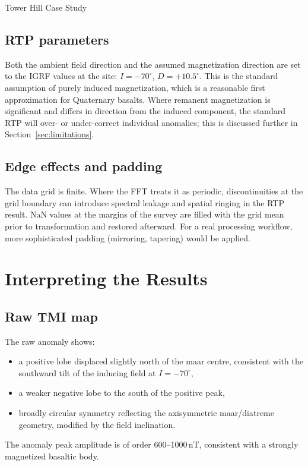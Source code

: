 \begin{activity}{Tower Hill Case Study}
\subsection{RTP parameters}

Both the ambient field direction and the assumed magnetization direction
are set to the IGRF values at the site:
$I = -70^\circ$, $D = +10.5^\circ$.
This is the standard assumption of purely induced magnetization, which is
a reasonable first approximation for Quaternary basalts.
Where remanent magnetization is significant and differs in direction
from the induced component, the standard RTP will over- or under-correct
individual anomalies; this is discussed further in Section~\ref{sec:limitations}.

\subsection{Edge effects and padding}

The data grid is finite.
Where the FFT treats it as periodic, discontinuities at the grid boundary
can introduce spectral leakage and spatial ringing in the RTP result.
NaN values at the margins of the survey are filled with the grid mean prior
to transformation and restored afterward.
For a real processing workflow, more sophisticated padding (mirroring,
tapering) would be applied.

\section{Interpreting the Results}

\subsection{Raw TMI map}

The raw anomaly shows:
\begin{itemize}
  \item a positive lobe displaced slightly north of the maar centre, consistent
        with the southward tilt of the inducing field at $I = -70^\circ$,
  \item a weaker negative lobe to the south of the positive peak,
  \item broadly circular symmetry reflecting the axisymmetric maar/diatreme
        geometry, modified by the field inclination.
\end{itemize}
The anomaly peak amplitude is of order 600--1000\,nT, consistent with a
strongly magnetized basaltic body.


\end{activity}
